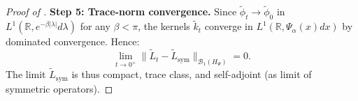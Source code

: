 \begin{proof}[Proof of ]
\vspace{1em}
\noindent\textbf{Step 5: Trace-norm convergence.}  
Since $\tilde{\phi}_t \to \tilde{\phi}_0$ in $L^1(\mathbb{R}, e^{-\beta |\lambda|} d\lambda)$ for any $\beta < \pi$, the kernels $\tilde{k}_t$ converge in $L^1(\mathbb{R}, \Psi_\alpha(x) dx)$ by dominated convergence. Hence:
\[
\lim_{t \to 0^+} \| \tilde{L}_t - \tilde{L}_{\mathrm{sym}} \|_{\mathcal{B}_1(H_\Psi)} = 0.
\]
The limit $\tilde{L}_{\mathrm{sym}}$ is thus compact, trace class, and self-adjoint (as limit of symmetric operators).
\end{proof}
